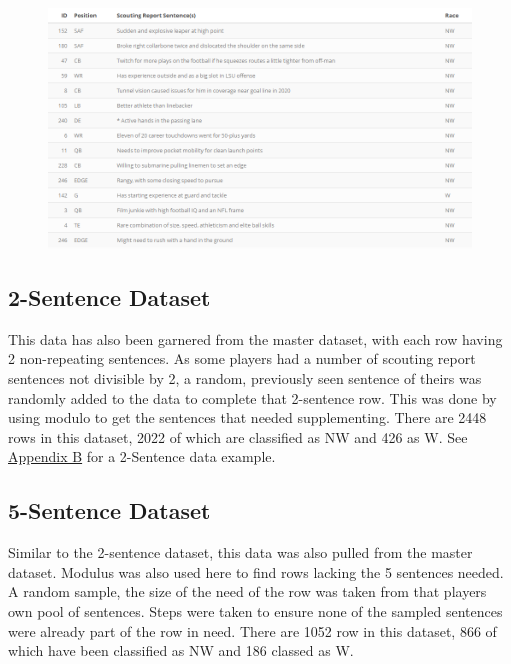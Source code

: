 \documentclass[oneside,12pt]{Classes/RoboticsLaTeX}
\begin{document}
\begin{figure}[hb]
  \centering
  \begin{minipage}{1\textwidth}
    \centering
    \includegraphics[width=1\linewidth]{Figures/1_sentence.png}
    \label{fig:1-sentence_dataset_sample}
  \end{minipage}%
\end{figure}

\subsection{2-Sentence Dataset}
This data has also been garnered from the master dataset, with each row having 2 non-repeating sentences. As some players had a number of scouting report sentences not divisible by 2,
a random, previously seen sentence of theirs was randomly added to the data to complete that 2-sentence row. This was done by using modulo to get the sentences that needed supplementing.
There are 2448 rows in this dataset, 2022 of which are classified as NW and 426 as W. See \hyperref[chap:Figures]{Appendix B} for a 2-Sentence data example.

\subsection{5-Sentence Dataset}
Similar to the 2-sentence dataset, this data was also pulled from the master dataset. Modulus was also used here to find rows lacking the 5 sentences needed. A random sample, the size of the need
of the row was taken from that players own pool of sentences. Steps were taken to ensure none of the sampled sentences were already part of the row in need. There are 1052 row in this dataset, 866 
of which have been classified as NW and 186 classed as W.
\end{document}
